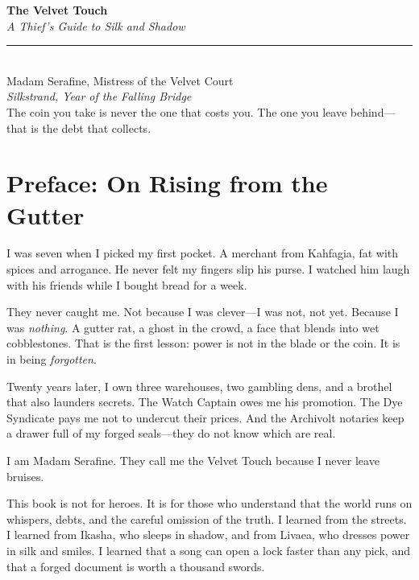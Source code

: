 \documentclass[10pt,twoside]{book}
\begin{document}
\begin{titlepage}
\begin{center}
\vspace*{2cm}
{\huge\bfseries\color{velvetRed} The Velvet Touch}\\[0.8cm]
{\Large\itshape A Thief's Guide to Silk and Shadow}\\[1.5cm]
\rule{0.6\textwidth}{1pt}\\[0.5cm]
{\large Madam Serafine, Mistress of the Velvet Court}\\[0.3cm]
{\em Silkstrand, Year of the Falling Bridge}\\[1cm]
\vfill
{\small \textcolor{silkGrey}{The coin you take is never the one that costs you. The one you leave behind---that is the debt that collects.}}
\end{center}
\end{titlepage}

\chapter*{Preface: On Rising from the Gutter}

I was seven when I picked my first pocket. A merchant from Kahfagia, fat with spices and arrogance. He never felt my fingers slip his purse. I watched him laugh with his friends while I bought bread for a week.

They never caught me. Not because I was clever---I was not, not yet. Because I was \emph{nothing}. A gutter rat, a ghost in the crowd, a face that blends into wet cobblestones. That is the first lesson: power is not in the blade or the coin. It is in being \emph{forgotten}.

Twenty years later, I own three warehouses, two gambling dens, and a brothel that also launders secrets. The Watch Captain owes me his promotion. The Dye Syndicate pays me not to undercut their prices. And the Archivolt notaries keep a drawer full of my forged seals---they do not know which are real.

I am Madam Serafine. They call me the Velvet Touch because I never leave bruises.

This book is not for heroes. It is for those who understand that the world runs on whispers, debts, and the careful omission of the truth. I learned from the streets. I learned from Ikasha, who sleeps in shadow, and from Livaea, who dresses power in silk and smiles. I learned that a song can open a lock faster than any pick, and that a forged document is worth a thousand swords.
\end{document}
